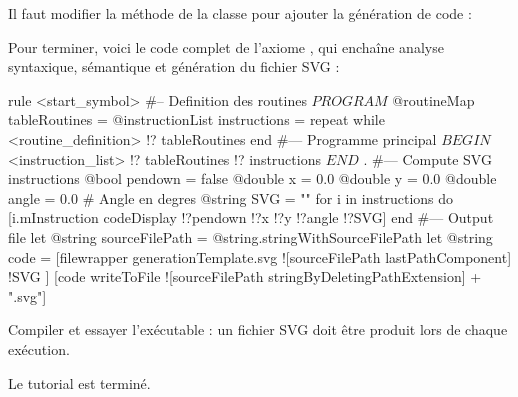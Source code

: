 Il faut modifier la méthode  de la classe  pour ajouter la génération de code :


Pour terminer, voici le code complet de l’axiome , qui enchaîne analyse syntaxique, sémantique et génération du fichier SVG :
\begin{galgascode}
rule <start_symbol> {
#-- Definition des routines
  $PROGRAM$
  @routineMap tableRoutines = {}
  @instructionList instructions = {}
  repeat
  while
    <routine_definition> !? tableRoutines
  end
#--- Programme principal
  $BEGIN$
  <instruction_list> !? tableRoutines !? instructions
  $END$
  $.$
#--- Compute SVG instructions
  @bool pendown = false
  @double x = 0.0
  @double y = 0.0
  @double angle = 0.0 # Angle en degres
  @string SVG = ""
  for i in instructions do
    [i.mInstruction codeDisplay !?pendown !?x !?y !?angle !?SVG]
  end
#--- Output file
  let @string sourceFilePath = @string.stringWithSourceFilePath
  let @string code = [filewrapper generationTemplate.svg
    ![sourceFilePath lastPathComponent]
    !SVG
  ]
  [code writeToFile ![sourceFilePath stringByDeletingPathExtension] + ".svg"]
}
\end{galgascode}

Compiler et essayer l'exécutable : un fichier SVG doit être produit lors de chaque exécution.

Le tutorial est terminé.
